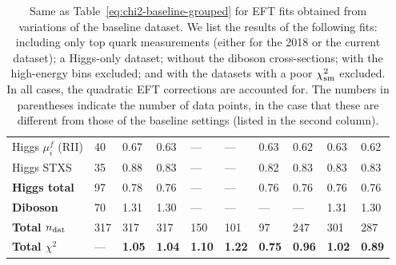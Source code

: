 \begin{table}[t]
\begin{tabular}{l|C{0.8cm}|C{0.7cm}|C{1.0cm}|C{1.0cm}|C{1.0cm}|C{1.5cm}|C{0.9cm}|C{1.2cm}|C{1.2cm}}
Higgs $\mu_i^f$ (RII)   &  40   & 0.67  & 0.63  &  ---  &  ---      &   0.63  &  0.62   & 0.63  &  0.62    \\
Higgs  STXS             &  35   & 0.88  & 0.83  &  ---  &  ---      &   0.82  &  0.83   & 0.83  &  0.83   \\
{\bf Higgs  total}      &  97   & 0.78  & 0.76  &  ---  &  ---      &   0.76   & 0.76   & 0.76  &  0.76   \\
\midrule
{\bf Diboson}           &  70   & 1.31  & 1.30  &  ---  &  ---      &  ---  &   ---  &  1.31   &  1.30    \\
\bottomrule
    {\bf Total $n_{\rm dat}$}    & 317    &  317   &  317   &  150  & 101  & 97   &247  & 301  & 287    \\
    {\bf Total $\chi^2$}    & ---    &  {\bf 1.05}    &  {\bf 1.04}  &  {\bf 1.10}  &  {\bf 1.22}  &
    {\bf 0.75}  &  {\bf 0.96} &  {\bf 1.02}   & {\bf 0.89}    \\ 
\bottomrule
\end{tabular}
  \caption{\small Same as Table~\ref{eq:chi2-baseline-grouped}  for EFT fits obtained from
    variations of the baseline dataset.
    We list the results of the following fits: including only  top quark measurements (either for the 2018 or the current
    dataset); a Higgs-only dataset; without the diboson cross-sections; with the high-energy bins excluded;
    and with the datasets with a poor $\chi^2_{\rm sm}$ excluded.
    In all cases, the  quadratic EFT corrections are accounted for.
    The numbers in parentheses indicate the number of data points, in the case that these are different
    from those of the baseline settings (listed in the second column).
\label{eq:chi2-datasetvariations}
}
\end{table}

